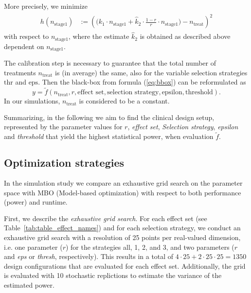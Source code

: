 \documentclass[bimj,fleqn]{w-art}
\theoremstyle{plain}
\theoremstyle{definition}
\begin{document}
More precisely, we minimize
\begin{align}
  \label{eq:targettreat}
  \begin{split}
  h(n_{\text{stage1}}) &:= \left( \Big(k_1 \cdot n_{\text{stage1}} + \hat{k}_2 \cdot %
  \frac{1-r}{r} \cdot n_{\text{stage1}}
  \Big) - n_{\text{treat}} \right)^2
  \end{split}
\end{align}
with respect to $n_{\text{stage1}}$, where the estimate $\hat{k}_2$ is obtained as described above dependent on $n_{\text{stage1}}$. 

The calibration step is necessary to guarantee that the total number of treatments $n_{\text{treat}}$ is (in average) the same, also for the variable selection strategies $\text{thr}$ and $\text{eps}$. Then the black-box from formula (\ref{eq:bbox}) can be reformulated as 
\begin{equation}
  y = \tilde{f}(n_{\text{treat}}, r, \text{effect set}, \text{selection strategy}, \text{epsilon}, \text{threshold}).
\end{equation}
In our simulations, $n_{\text{treat}}$ is considered to be a constant.

Summarizing, in the following we aim to find the clinical design setup, represented by the parameter values for $r$, \emph{effect set}, \emph{Selection strategy}, \emph{epsilon} and \emph{threshold} that yield the highest statistical power, when evaluation $\tilde{f}$.

\subsection{Optimization strategies}

In the simulation study we compare an exhaustive grid search on the parameter space with MBO (Model-based optimization) with respect to both performance (power) and runtime.

First, we describe the \emph{exhaustive grid search}.
For each effect set (see Table~\ref{tab:table_effect_names}) and for each selection strategy, we conduct an exhaustive grid search with a resolution of 25 points per real-valued dimension, i.e. one parameter ($r$) for the strategies all, 1, 2, and 3, and two parameters ($r$ and \emph{eps} or \emph{thresh}, respectively).
This results in a total of $4 \cdot 25 + 2 \cdot 25 \cdot 25 = 1350$ design configurations that are evaluated for each effect set.
Additionally, the grid is evaluated with 10 stochastic replictions to estimate the variance of the estimated power.
\end{document}
